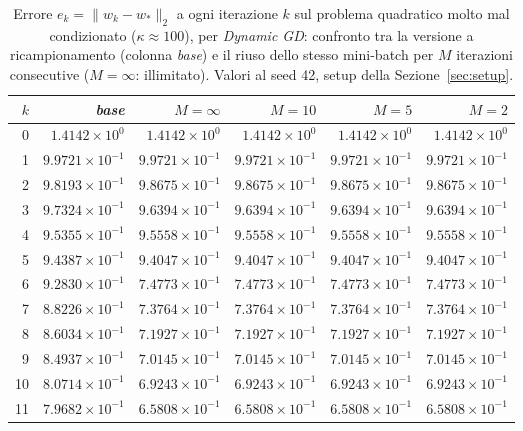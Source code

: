 \begin{table}[H]
\centering
\footnotesize
\renewcommand{\arraystretch}{0.85}
\setlength{\tabcolsep}{4pt}
\caption{Errore $e_k=\|w_k-w_*\|_2$ a ogni iterazione $k$ sul problema quadratico molto mal condizionato ($\kappa\approx 100$), per \emph{Dynamic GD}: confronto tra la versione a ricampionamento (colonna \emph{base}) e il riuso dello stesso mini-batch per $M$ iterazioni consecutive ($M=\infty$: illimitato). Valori al seed 42, setup della Sezione~\ref{sec:setup}.}
\label{tab:riuso_veryill_gd}
\begin{tabular}{@{}rrrrrr@{}}
\toprule
$k$ & \emph{base} & $M{=}\infty$ & $M{=}10$ & $M{=}5$ & $M{=}2$\\
\midrule
0 & $1.4142\times10^{0}$ & $1.4142\times10^{0}$ & $1.4142\times10^{0}$ & $1.4142\times10^{0}$ & $1.4142\times10^{0}$\\
1 & $9.9721\times10^{-1}$ & $9.9721\times10^{-1}$ & $9.9721\times10^{-1}$ & $9.9721\times10^{-1}$ & $9.9721\times10^{-1}$\\
2 & $9.8193\times10^{-1}$ & $9.8675\times10^{-1}$ & $9.8675\times10^{-1}$ & $9.8675\times10^{-1}$ & $9.8675\times10^{-1}$\\
3 & $9.7324\times10^{-1}$ & $9.6394\times10^{-1}$ & $9.6394\times10^{-1}$ & $9.6394\times10^{-1}$ & $9.6394\times10^{-1}$\\
4 & $9.5355\times10^{-1}$ & $9.5558\times10^{-1}$ & $9.5558\times10^{-1}$ & $9.5558\times10^{-1}$ & $9.5558\times10^{-1}$\\
5 & $9.4387\times10^{-1}$ & $9.4047\times10^{-1}$ & $9.4047\times10^{-1}$ & $9.4047\times10^{-1}$ & $9.4047\times10^{-1}$\\
6 & $9.2830\times10^{-1}$ & $7.4773\times10^{-1}$ & $7.4773\times10^{-1}$ & $7.4773\times10^{-1}$ & $7.4773\times10^{-1}$\\
7 & $8.8226\times10^{-1}$ & $7.3764\times10^{-1}$ & $7.3764\times10^{-1}$ & $7.3764\times10^{-1}$ & $7.3764\times10^{-1}$\\
8 & $8.6034\times10^{-1}$ & $7.1927\times10^{-1}$ & $7.1927\times10^{-1}$ & $7.1927\times10^{-1}$ & $7.1927\times10^{-1}$\\
9 & $8.4937\times10^{-1}$ & $7.0145\times10^{-1}$ & $7.0145\times10^{-1}$ & $7.0145\times10^{-1}$ & $7.0145\times10^{-1}$\\
10 & $8.0714\times10^{-1}$ & $6.9243\times10^{-1}$ & $6.9243\times10^{-1}$ & $6.9243\times10^{-1}$ & $6.9243\times10^{-1}$\\
11 & $7.9682\times10^{-1}$ & $6.5808\times10^{-1}$ & $6.5808\times10^{-1}$ & $6.5808\times10^{-1}$ & $6.5808\times10^{-1}$\\

\end{tabular}
\end{table}
